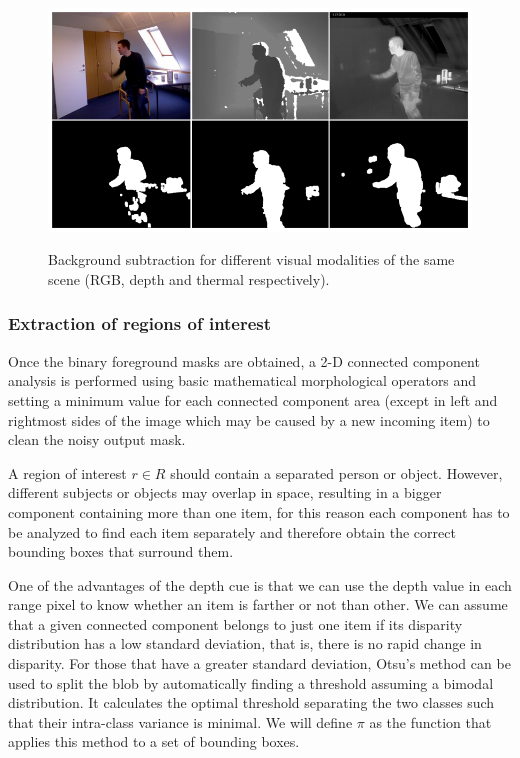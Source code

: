 \documentclass[10pt,twocolumn,letterpaper]{article}
\begin{document}
 \begin{figure}[!h]
{\includegraphics[width=\linewidth]{bs.eps}}
\caption{Background subtraction for different visual
modalities of the same scene (RGB, depth and thermal respectively).
\label{fig:bscomparison}}
\end{figure}

\subsubsection{Extraction of regions of interest}
\label{sssec:extreg}
Once the binary foreground masks are obtained, a 2-D connected component analysis is performed using basic mathematical morphological operators and setting a minimum value for each connected component area (except in left and rightmost sides of the image which may be caused by a new incoming item) to clean the noisy output mask. 

A region of interest $r \in R$ should contain a separated person or object. However, different subjects or objects may overlap in space, resulting in a bigger component containing more than one item, for this reason each component has to be analyzed to find each item separately and therefore obtain the correct bounding boxes that surround them.

One of the advantages of the depth cue is that we can use the depth value in each range pixel to know whether an item is farther or not than other. We can assume that a given connected component belongs to just one item if its disparity distribution has a low standard deviation, that is, there is no rapid change in disparity. For those that have a greater standard deviation, Otsu's method \cite{otsu1975threshold} can be used to split the blob by automatically finding a threshold assuming a bimodal distribution. It calculates the optimal threshold separating the two classes such that their intra-class variance is minimal. We will define $\pi$ as the function that applies this method to a set of bounding boxes.
\end{document}
